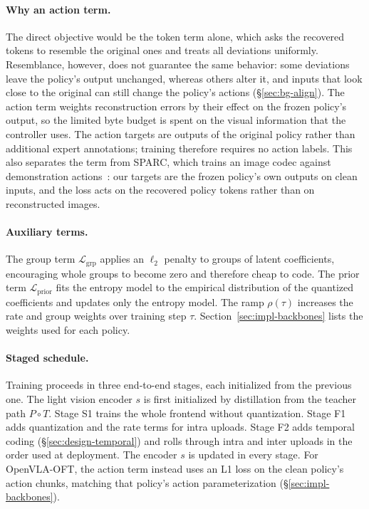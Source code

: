 \paragraph{Why an action term.}
The direct objective would be the token term alone, which asks the
recovered tokens to resemble the original ones and treats all deviations
uniformly. Resemblance, however, does not guarantee the same behavior:
some deviations leave the policy's output unchanged, whereas others alter
it, and inputs that look close to the original can still change the
policy's actions (\S\ref{sec:bg-align}). The action term weights reconstruction errors
by their effect on the frozen policy's output, so the limited byte
budget is spent on the visual information that the controller uses.
The action targets are outputs of the original policy rather than
additional expert annotations; training therefore requires no action
labels. This also separates the term from SPARC, which trains an image
codec against demonstration actions~\cite{sparc}: our targets are the
frozen policy's own outputs on clean inputs, and the loss acts on the
recovered policy tokens rather than on reconstructed images.

\paragraph{Auxiliary terms.}
The group term $\mathcal{L}_{\mathrm{grp}}$ applies an $\ell_2$ penalty
to groups of latent coefficients, encouraging whole groups to become zero
and therefore cheap to code. The prior term $\mathcal{L}_{\mathrm{prior}}$
fits the entropy model to the empirical distribution of the quantized
coefficients and updates only the entropy model. The ramp $\rho(\tau)$
increases the rate and group weights over training step $\tau$.
Section~\ref{sec:impl-backbones} lists the weights used for each policy.

\paragraph{Staged schedule.}
Training proceeds in three end-to-end stages, each initialized from the
previous one. The light vision encoder $s$ is first initialized by distillation from
the teacher path $P \circ T$. Stage S1 trains the whole frontend without
quantization. Stage F1 adds quantization and the rate terms for intra
uploads. Stage F2 adds temporal coding (\S\ref{sec:design-temporal}) and
rolls through intra and inter uploads in the order used at deployment.
The encoder $s$ is updated in every stage. For OpenVLA-OFT, the action
term instead uses an L1 loss on the clean policy's action chunks, matching
that policy's action parameterization (\S\ref{sec:impl-backbones}).

